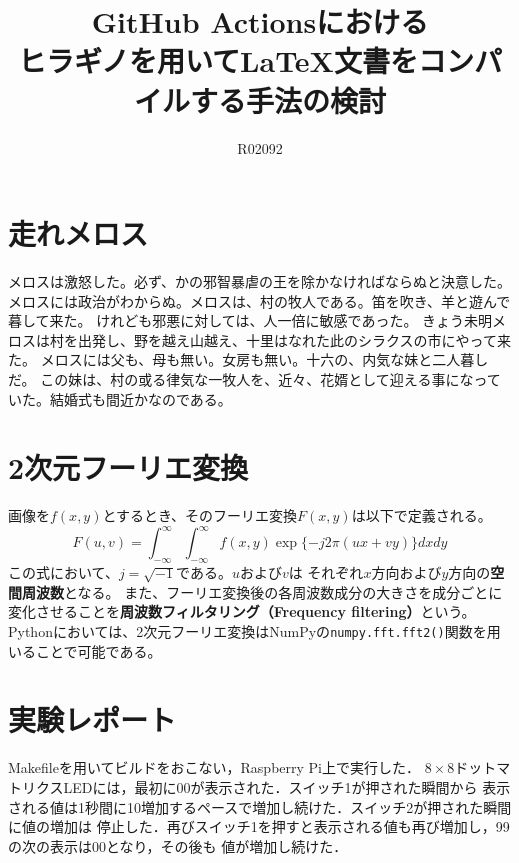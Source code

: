 \documentclass{jlreq}
\title{GitHub Actionsにおける\\ヒラギノを用いて\LaTeX 文書をコンパイルする手法の検討}
\author{R02092}
\renewcommand\emph[1]{\textbf{\textsf{#1}}}
\begin{document}
	\maketitle
	\section{走れメロス}
	メロスは激怒した。必ず、かの邪智暴虐の王を除かなければならぬと決意した。
	メロスには政治がわからぬ。メロスは、村の牧人である。笛を吹き、羊と遊んで暮して来た。
	けれども邪悪に対しては、人一倍に敏感であった。
	きょう未明メロスは村を出発し、野を越え山越え、十里はなれた此のシラクスの市にやって来た。
	メロスには父も、母も無い。女房も無い。十六の、内気な妹と二人暮しだ。
	この妹は、村の或る律気な一牧人を、近々、花婿として迎える事になっていた。結婚式も間近かなのである。
	\section{2次元フーリエ変換}
	画像を$f(x,y)$とするとき、そのフーリエ変換$F(x,y)$は以下で定義される。
	\[
		F(u,v)=\int^\infty_{-\infty}\int^\infty_{-\infty}f(x,y)\exp\{-j2\pi(ux+vy)\}dxdy
	\]
	この式において、$j=\sqrt{-1}$である。$u$および$v$は
	それぞれ$x$方向および$y$方向の\emph{空間周波数}となる。
	また、フーリエ変換後の各周波数成分の大きさを成分ごとに
	変化させることを\emph{周波数フィルタリング（Frequency filtering）}という。
	Pythonにおいては、2次元フーリエ変換はNumPyの\verb|numpy.fft.fft2()|関数を用いることで可能である。
	\section{実験レポート}
	Makefileを用いてビルドをおこない，Raspberry Pi上で実行した．
	$8\times 8$ドットマトリクスLEDには，最初に00が表示された．スイッチ1が押された瞬間から
	表示される値は1秒間に10増加するペースで増加し続けた．スイッチ2が押された瞬間に値の増加は
	停止した．再びスイッチ1を押すと表示される値も再び増加し，99の次の表示は00となり，その後も
	値が増加し続けた．
\end{document}

